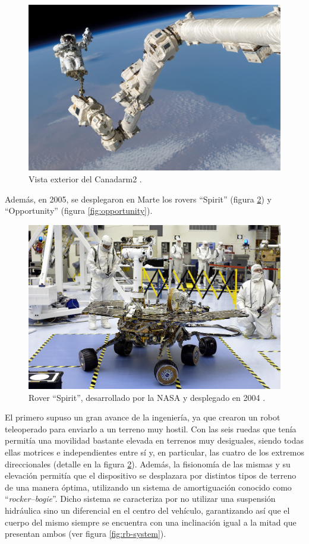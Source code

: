 \begin{figure}[H]
    \centering
    \includegraphics[width=.63\linewidth]{pictures/STS-114_Steve_Robinson_on_Canadarm2.jpg}
    \caption{Vista exterior del Canadarm2 \cite{MobileServicingSystem2020a}.}
    \label{fig:canadarm2}
\end{figure}

Además, en 2005, se desplegaron en Marte los rovers ``Spirit'' (figura \ref{fig:spirit}) y 
``Opportunity'' (figura \ref{fig:opportunity}). 

\begin{figure}
    \centering
    \includegraphics[width=.75\linewidth]{pictures/spirit_rover.jpg}
    \caption{Rover ``Spirit'', desarrollado por la NASA y desplegado en 2004 \cite{SpiritRover2020a}.}
    \label{fig:spirit}
\end{figure}

El primero supuso un gran avance de la
ingeniería, ya que crearon un robot teleoperado para enviarlo a un terreno
muy hostil. Con las seis ruedas que tenía permitía una movilidad bastante elevada en
terrenos muy desiguales, siendo todas ellas motrices e independientes entre sí y, 
en particular, las cuatro de los extremos direccionales (detalle en la figura \ref{fig:spirit}). 
Además, la fisionomía de las mismas y su elevación permitía que el dispositivo se desplazara por
distintos tipos de terreno de una manera óptima, utilizando un sistema de amortiguación
conocido como ``\textit{rocker--bogie}''. Dicho sistema se caracteriza por no utilizar
una suspensión hidráulica sino un diferencial en el centro del vehículo, garantizando así
que el cuerpo del mismo siempre se encuentra con una inclinación igual a la mitad que presentan
ambos (ver figura \ref{fig:rb-system}).

